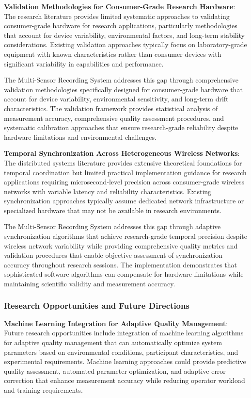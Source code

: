 \documentclass[12pt,a4paper]{report}
\begin{document}
\textbf{Validation Methodologies for Consumer-Grade Research Hardware}: The research literature provides limited systematic
approaches to validating consumer-grade hardware for research applications, particularly methodologies that account for
device variability, environmental factors, and long-term stability considerations. Existing validation approaches
typically focus on laboratory-grade equipment with known characteristics rather than consumer devices with significant
variability in capabilities and performance.

The Multi-Sensor Recording System addresses this gap through comprehensive validation methodologies specifically
designed for consumer-grade hardware that account for device variability, environmental sensitivity, and long-term drift
characteristics. The validation framework provides statistical analysis of measurement accuracy, comprehensive quality
assessment procedures, and systematic calibration approaches that ensure research-grade reliability despite hardware
limitations and environmental challenges.

\textbf{Temporal Synchronization Across Heterogeneous Wireless Networks}: The distributed systems literature provides
extensive theoretical foundations for temporal coordination but limited practical implementation guidance for research
applications requiring microsecond-level precision across consumer-grade wireless networks with variable latency and
reliability characteristics. Existing synchronization approaches typically assume dedicated network infrastructure or
specialized hardware that may not be available in research environments.

The Multi-Sensor Recording System addresses this gap through adaptive synchronization algorithms that achieve
research-grade temporal precision despite wireless network variability while providing comprehensive quality metrics and
validation procedures that enable objective assessment of synchronization accuracy throughout research sessions. The
implementation demonstrates that sophisticated software algorithms can compensate for hardware limitations while
maintaining scientific validity and measurement accuracy.

\subsubsection{Research Opportunities and Future Directions}

\textbf{Machine Learning Integration for Adaptive Quality Management}: Future research opportunities include integration of
machine learning algorithms for adaptive quality management that can automatically optimize system parameters based on
environmental conditions, participant characteristics, and experimental requirements. Machine learning approaches could
provide predictive quality assessment, automated parameter optimization, and adaptive error correction that enhance
measurement accuracy while reducing operator workload and training requirements.
\end{document}

